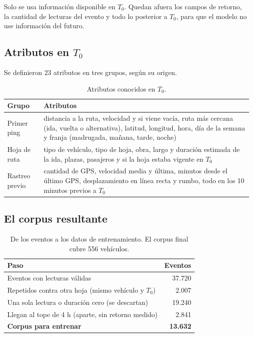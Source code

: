 \documentclass[11pt,a4paper]{article}
\begin{document}
Solo se usa información disponible en $T_0$. Quedan afuera los campos de retorno, la cantidad de
lecturas del evento y todo lo posterior a $T_0$, para que el modelo no use información del futuro.

\subsection{Atributos en $T_0$}

Se definieron 23 atributos en tres grupos, según su origen.

\begin{table}[h]
  \centering
  \begin{tabular}{@{}lp{10.5cm}@{}}
    \toprule
    \textbf{Grupo} & \textbf{Atributos} \\
    \midrule
    Primer ping &
      distancia a la ruta, velocidad y si viene vacía, ruta más cercana (ida, vuelta o alternativa),
      latitud, longitud, hora, día de la semana y franja (madrugada, mañana, tarde, noche) \\
    Hoja de ruta &
      tipo de vehículo, tipo de hoja, obra, largo y duración estimada de la ida, plazas, pasajeros y si la
      hoja estaba vigente en $T_0$ \\
    Rastreo previo &
      cantidad de GPS, velocidad media y última, minutos desde el último GPS, desplazamiento en línea
      recta y rumbo, todo en los 10 minutos previos a $T_0$ \\
    \bottomrule
  \end{tabular}
  \caption{Atributos conocidos en $T_0$.}
\end{table}

\subsection{El corpus resultante}

\begin{table}[h]
  \centering
  \begin{tabular}{@{}lr@{}}
    \toprule
    \textbf{Paso} & \textbf{Eventos} \\
    \midrule
    Eventos con lecturas válidas                       & 37.720 \\
    Repetidos contra otra hoja (mismo vehículo y $T_0$) & 2.007 \\
    Una sola lectura o duración cero (se descartan)    & 19.240 \\
    Llegan al tope de 4 h (aparte, sin retorno medido) & 2.841 \\
    \midrule
    \textbf{Corpus para entrenar}                      & \textbf{13.632} \\
    \bottomrule
  \end{tabular}
  \caption{De los eventos a los datos de entrenamiento. El corpus final cubre 556 vehículos.}
\end{table}
\end{document}
